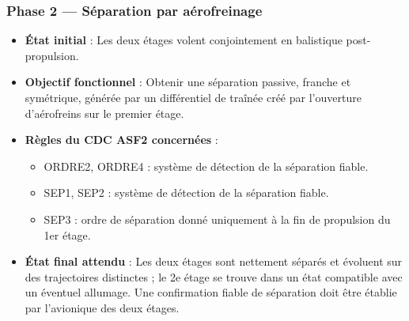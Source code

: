 \subsubsection*{Phase 2 — Séparation par aérofreinage}
\begin{itemize}
    \item \textbf{État initial} : Les deux étages volent conjointement en balistique post-propulsion.
    \item \textbf{Objectif fonctionnel} : Obtenir une séparation passive, franche et symétrique, générée par un différentiel
    de traînée créé par l’ouverture d'aérofreins sur le premier étage.
    \item \textbf{Règles du \acrshort{CDC} ASF2 concernées} :
    \begin{itemize}
        \item ORDRE2, ORDRE4\cite[p. ~78-80]{CDC_BiEtage} : système de détection de la séparation fiable.
        \item SEP1, SEP2\cite[p. ~87-88]{CDC_BiEtage} : système de détection de la séparation fiable.
        \item SEP3\cite[p. ~87-88]{CDC_BiEtage} : ordre de séparation donné uniquement à la fin de propulsion du 1er étage.
    \end{itemize}
    \item \textbf{État final attendu} : Les deux étages sont nettement séparés et évoluent sur des trajectoires distinctes ; le
    2e étage se trouve dans un état compatible avec un éventuel allumage. Une confirmation fiable de séparation doit être
    établie par l’avionique des deux étages.
\end{itemize}

